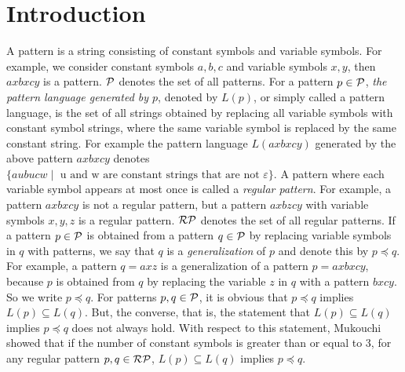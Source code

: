 \section{Introduction}

A pattern is a string consisting of constant symbols and variable symbols.
For example, we consider constant symbols $a,b,c$ and variable symbols $x,y$,  then $axbxcy$ is a pattern.
$\mathcal{P}$ denotes the set of all patterns.
For a pattern $p\in \mathcal{P}$, {\it the pattern language generated by $p$}, denoted by $L(p)$, or simply called a pattern language, is the set of all strings obtained by replacing all variable symbols with constant symbol strings, where the same variable symbol is replaced by the same constant string.
For example the pattern language $L(axbxcy)$ generated by the above pattern $axbxcy$ denotes $\{ aubucw \mid \mbox{  u and w are constant strings that are not $\varepsilon$} \}$.
A pattern where each variable symbol appears at most once is called a {\it regular pattern}. 
For example, a pattern $axbxcy$ is not a regular pattern, but a pattern $axbzcy$ with variable symbols $x,y,z$ is a regular pattern.
$\mathcal{RP}$ denotes the set of all regular patterns.
If a pattern $p\in \mathcal{P}$ is obtained from a pattern $q\in\mathcal{P}$ by replacing variable symbols in $q$ with patterns, we say that $q$ is a {\it generalization} of $p$ and denote this by $p\preceq q$.
For example, a pattern $q=axz$ is a generalization of a pattern $p=axbxcy$, because $p$ is obtained from $q$ by replacing the variable $z$ in $q$ with a pattern $bxcy$.
So we write $p\preceq q$.
For patterns $p,q\in \mathcal{P}$, it is obvious that $p\preceq q$ implies $L(p)\subseteq L(q)$.
But, the converse, that is, the statement that  $L(p)\subseteq L(q)$ implies $p\preceq q$ does not always hold.
With respect to this statement, Mukouchi\cite{Mukouchi1991} showed that if the number of constant symbols is greater than or equal to 3, for any regular pattern $p,q\in \mathcal{RP}$, $L(p)\subseteq L(q)$ implies $p\preceq q$.

